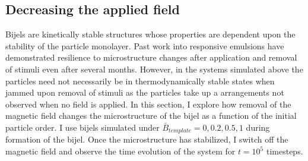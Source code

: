 \subsection{Decreasing the applied
field}\label{decreasing-the-applied-field}

Bijels are kinetically stable structures whose properties are dependent
upon the stability of the particle monolayer. Past work into responsive
emulsions have demonstrated resilience to microstructure changes after
application and removal of stimuli even after several months. \cite{cui_stabilizing_2013} However,
in the systems simulated above the particles need not necessarily be in
thermodynamically stable states when jammed upon removal of stimuli as
the particles take up a arrangements not observed when no field is
applied. In this section, I explore how removal of the magnetic field
changes the microstructure of the bijel as a function of the initial
particle order. I use bijels simulated under
$\bar{B}_{template} = 0, 0.2, 0.5, 1$ during formation of the bijel. Once
the microstructure has stabilized, I switch off the magnetic field and
observe the time evolution of the system for $t = 10^5$ timesteps.

